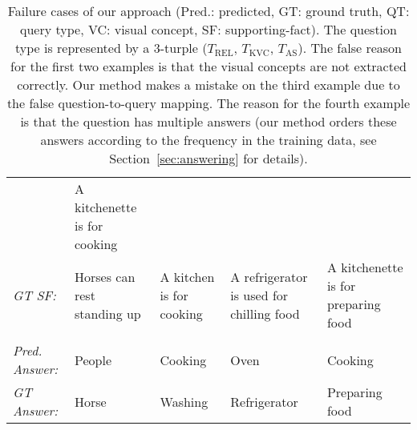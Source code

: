 \documentclass[10pt,journal]{IEEEtran}
\begin{document}
\begin{table*}[t!]
{\begin{tabular}{lllll}
                        & A kitchenette is for cooking\\
			\textit{GT SF:}
                        & Horses can rest standing up
                        & A kitchen is for cooking
                        & A refrigerator is used for chilling food
                        & A kitchenette is for preparing food\\ \hline \\ [-2ex] 
			\textit{Pred. Answer:}
                        & People
                        & Cooking
                        & Oven
                        & Cooking\\
			\textit{GT Answer:}
                        & Horse
                        & Washing
                        & Refrigerator
                        & Preparing food\\ \hline
\end{tabular}}
	        \caption{Failure cases of our approach (Pred.: predicted, GT: ground truth, QT: query type, VC: visual concept, SF: supporting-fact).
	        	The question type is represented by a $3$-turple (\texttt{$T_{\mbox{REL}}$}, \texttt{$T_{\mbox{KVC}}$}, \texttt{$T_{\mbox{AS}}$}).
                          The false reason for the first two examples is that the visual concepts are not extracted correctly.
                          Our method makes a mistake on the third example due to the false question-to-query mapping.
                          The reason for the fourth example is that the question has multiple answers (our method orders these answers according to the frequency in the training data, see Section~\ref{sec:answering} for details).
                          }
		\label{neg_results_examples}
\end{table*}
\end{document}
